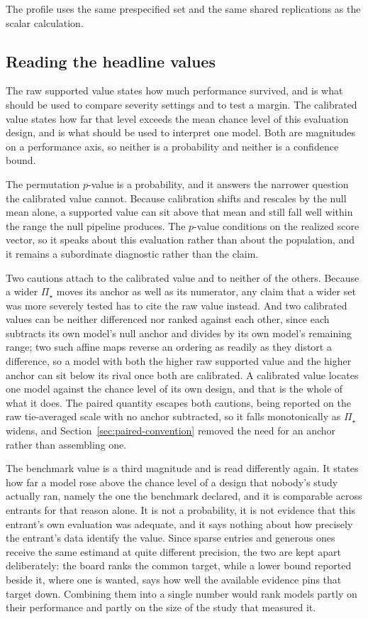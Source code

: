 \documentclass[11pt]{article}
\newcommand{\PSet}{\Pi_\star}
\theoremstyle{remark}
\begin{document}
The profile uses the same prespecified set and the same shared replications as the scalar calculation.

\subsection{Reading the headline values}

The raw supported value states how much performance survived, and is what should be used to compare severity settings and to test a margin. The calibrated value states how far that level exceeds the mean chance level of this evaluation design, and is what should be used to interpret one model. Both are magnitudes on a performance axis, so neither is a probability and neither is a confidence bound.

The permutation $p$-value is a probability, and it answers the narrower question the calibrated value cannot. Because calibration shifts and rescales by the null mean alone, a supported value can sit above that mean and still fall well within the range the null pipeline produces. The $p$-value conditions on the realized score vector, so it speaks about this evaluation rather than about the population, and it remains a subordinate diagnostic rather than the claim.

Two cautions attach to the calibrated value and to neither of the others. Because a wider $\PSet$ moves its anchor as well as its numerator, any claim that a wider set was more severely tested has to cite the raw value instead. And two calibrated values can be neither differenced nor ranked against each other, since each subtracts its own model's null anchor and divides by its own model's remaining range; two such affine maps reverse an ordering as readily as they distort a difference, so a model with both the higher raw supported value and the higher anchor can sit below its rival once both are calibrated. A calibrated value locates one model against the chance level of its own design, and that is the whole of what it does. The paired quantity escapes both cautions, being reported on the raw tie-averaged scale with no anchor subtracted, so it falls monotonically as $\PSet$ widens, and Section~\ref{sec:paired-convention} removed the need for an anchor rather than assembling one.

The benchmark value is a third magnitude and is read differently again. It states how far a model rose above the chance level of a design that nobody's study actually ran, namely the one the benchmark declared, and it is comparable across entrants for that reason alone. It is not a probability, it is not evidence that this entrant's own evaluation was adequate, and it says nothing about how precisely the entrant's data identify the value. Since sparse entries and generous ones receive the same estimand at quite different precision, the two are kept apart deliberately: the board ranks the common target, while a lower bound reported beside it, where one is wanted, says how well the available evidence pins that target down. Combining them into a single number would rank models partly on their performance and partly on the size of the study that measured it.
\end{document}
